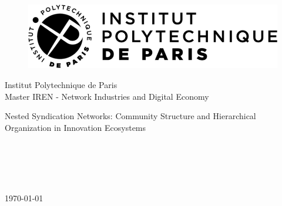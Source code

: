\begin{figure}[t]
\includegraphics[width=0.7\columnwidth]{../figures/ipparis-logo.png}
\centering
\end{figure}

\begin{titlepage}
\begin{center}
Institut Polytechnique de Paris \\
Master IREN - Network Industries and Digital Economy \\
\vspace{44pt}

\huge Nested Syndication Networks: Community Structure and Hierarchical Organization in Innovation Ecosystems\\
\vspace{44pt}

\normalsize
{}\\  
\vspace{74pt}

\begin{center}
    \\ 
    \\   
\end{center}

\vspace{\fill}
\today \\
\end{center}
\end{titlepage}


\pagebreak